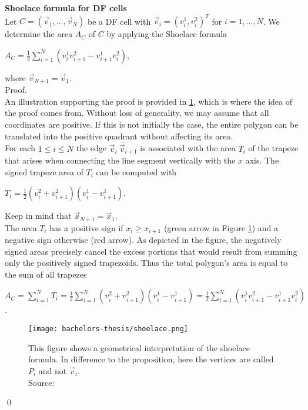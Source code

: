 \begin{proposition}  \textbf{Shoelace formula for DF cells} \label{prop:Shoelace}\\ 
	Let $C = (\vec{v}_1, \ldots, \vec{v}_N)$ be a DF cell with $\vec{v}_i = (v_i^1, v_i^2)^T$ for $i=1,\ldots,N$.
	We determine the area $A_C$ of $C$ by applying the Shoelace formula
	\begin{center}
		$A_C = \frac{1}{2}\sum\limits_{i = 1}^{N} (v_i^1 v_{i+1}^2 - v_{i+1}^1 v_i^2)$,
	\end{center} 
	where $\vec{v}_{N + 1} = \vec{v}_1$. \\
	Proof. 	\\
	An illustration supporting the proof is provided in \ref{fig:shoelace}, which is where the idea of the proof comes from. 
	Without loss of generality, we may assume that all coordinates are positive.
	If this is not initially the case, the entire polygon can be translated into the positive quadrant without affecting its area. \\
	For each $1 \leq i \leq N$ the edge $\overline{ \vec{v}_i \: \vec{v}_{i+1}}$ is associated with the area $T_i$ of the trapeze that arises when connecting the line segment vertically with the $x$ axis. 
	The signed trapeze area of $T_i$ can be computed with 
	\begin{center}
		$T_i = \frac{1}{2} (v_i^2 + v_{i+1}^2)(v_i^1 - v_{i+1}^1)$.
	\end{center}
	Keep in mind that $\vec{x}_{N + 1} = \vec{x}_1$. \\
	The area $T_i$ has a positive sign if $x_i \geq x_{i+1}$ (green arrow in Figure \ref{fig:shoelace}) and a negative sign otherwise (red arrow). 
	As depicted in the figure, the negatively signed areas precisely cancel the excess portions that would result from summing only the positively signed trapezoids.
	Thus the total polygon's area is equal to the sum of all trapezes
	\begin{center}
		$A_C = \sum\limits_{i = 1}^{N} T_i = \frac{1}{2} \sum\limits_{i = 1}^{N} (v_i^2 + v_{i+1}^2)(v_i^1 - v_{i+1}^1) = \frac{1}{2}\sum\limits_{i = 1}^{N} (v_i^1 v_{i+1}^2 - v_{i+1}^1 v_i^2) $.
	\end{center} 
	\begin{figure}[h!]
		\begin{center}
			\texttt{[image: bachelors-thesis/shoelace.png]}
			\caption{
				This figure shows a geometrical interpretation of the shoelace formula. In difference to the proposition, here the vertices are called $P_i$ and not $\vec{v}_i$. \\
				Source: \cite{ShoelaceFigure2022}}
			\label{fig:shoelace}
		\end{center}
	\end{figure}
	\qed
\end{proposition}

